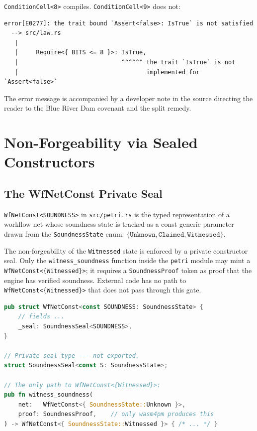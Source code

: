 \texttt{ConditionCell<8>} compiles. \texttt{ConditionCell<9>} does not:

\begin{verbatim}
error[E0277]: the trait bound `Assert<false>: IsTrue` is not satisfied
  --> src/law.rs
   |
   |     Require<{ BITS <= 8 }>: IsTrue,
   |                             ^^^^^^ the trait `IsTrue` is not
   |                                    implemented for `Assert<false>`
\end{verbatim}

The error message is accompanied by a developer note in the source directing
the reader to the Blue River Dam covenant and the split remedy.

\section{Non-Forgeability via Sealed Constructors}
\label{sec:arch-nonforgeability}

\subsection{The WfNetConst Private Seal}

\texttt{WfNetConst<SOUNDNESS>} in \texttt{src/petri.rs} is the typed
representation of a workflow net whose soundness state is tracked as a const
generic parameter drawn from the \texttt{SoundnessState} enum:
$\{\texttt{Unknown}, \texttt{Claimed}, \texttt{Witnessed}\}$.

The non-forgeability of the \texttt{Witnessed} state is enforced by a private
constructor seal. Only the \texttt{witness\_soundness} function inside the
\texttt{petri} module may mint a \texttt{WfNetConst<\{Witnessed\}>}; it
requires a \texttt{SoundnessProof} token as proof that the engine has verified
soundness. External code has no path to \texttt{WfNetConst<\{Witnessed\}>}
that does not pass through this gate.

\begin{lstlisting}[language=Rust, caption={Sealed constructor for
  \texttt{WfNetConst<\{Witnessed\}>}. The \texttt{SoundnessProof} token
  is only producible by the \texttt{wasm4pm} engine bridge. External
  code cannot construct it.}, label={lst:wfnet-seal}]
pub struct WfNetConst<const SOUNDNESS: SoundnessState> {
    // fields ...
    _seal: SoundnessSeal<SOUNDNESS>,
}

// Private seal type --- not exported.
struct SoundnessSeal<const S: SoundnessState>;

// The only path to WfNetConst<{Witnessed}>:
pub fn witness_soundness(
    net:   WfNetConst<{ SoundnessState::Unknown }>,
    proof: SoundnessProof,    // only wasm4pm produces this
) -> WfNetConst<{ SoundnessState::Witnessed }> { /* ... */ }
\end{lstlisting}


